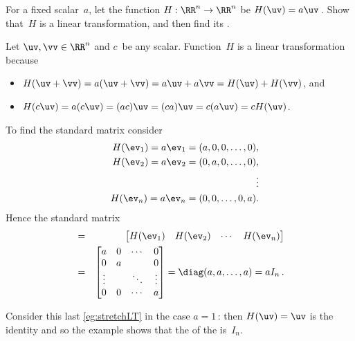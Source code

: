 \begin{example} \label{eg:stretchLT}
For a fixed scalar~\(a\), let the function \(H:\RR^n\to\RR^n\) be \(H(\uv)=a\uv\)\,.  Show that~\(H\) is a linear transformation, and then find its .
\begin{solution} 
Let \(\uv,\vv\in\RR^n\) and \(c\)~be any scalar.
Function~\(H\) is a linear transformation because
\begin{itemize}
\item \(H(\uv+\vv)=a(\uv+\vv)=a\uv+a\vv=H(\uv)+H(\vv)\), and
\item \(H(c\uv)=a(c\uv)=(ac)\uv=(ca)\uv=c(a\uv)=cH(\uv)\).
\end{itemize}
To find the standard matrix consider
\begin{eqnarray*}
&&H(\ev_1)=a\ev_1=(a,0,0,\ldots,0),
\\&&H(\ev_2)=a\ev_2=(0,a,0,\ldots,0),
\\&&\qquad\vdots
\\&&H(\ev_n)=a\ev_n=(0,0,\ldots,0,a).
\end{eqnarray*}
Hence the standard matrix 
\begin{eqnarray*}
[H]&=&\begin{bmatrix} H(\ev_1)&H(\ev_2)&\cdots&H(\ev_n) \end{bmatrix}
\\&=&\begin{bmatrix} a&0&\cdots&0
\\0&a&&0
\\\vdots&&\ddots&\vdots
\\0&0&\cdots&a \end{bmatrix}
=\diag(a,a,\ldots,a)
=aI_n\,.
\end{eqnarray*}

\end{solution}
\end{example}

Consider this last \cref{eg:stretchLT} in the case \(a=1\)\,: then \(H(\uv)=\uv\) is the identity and so the example shows that the  of the  is~\(I_n\).



